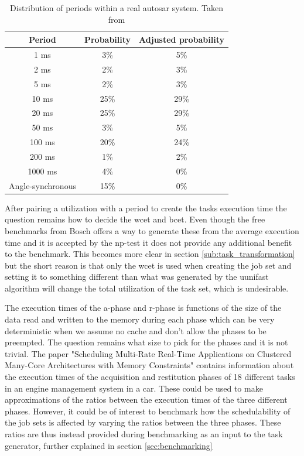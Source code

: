 \documentclass{kththesis}
\begin{document}
\begin{table}
    \centering
    \begin{tabular}{| c | c | c |} 
        \hline
        Period & Probability & Adjusted probability  \\
        \hline
        1 ms & 3\% & 5\% \\
        \hline
        2 ms & 2\% & 3\% \\
        \hline
        5 ms & 2\% & 3\% \\
        \hline
        10 ms & 25\% & 29\% \\
        \hline
        20 ms & 25\% & 29\% \\
        \hline
        50 ms & 3\% & 5\% \\
        \hline
        100 ms & 20\% & 24\% \\
        \hline
        200 ms & 1\% & 2\% \\
        \hline
        1000 ms & 4\% & 0\% \\
        \hline
        Angle-synchronous & 15\% & 0\% \\
        \hline
    \end{tabular}
    \caption{Distribution of periods within a real \acrshort{autosar} system. Taken from \parencite{kramer_real_2015}}
    \label{tab:period_distribution}
\end{table}

After pairing a utilization with a period to create the tasks execution time the question remains
how to decide the \acrshort{wcet} and \acrshort{bcet}. Even though the free benchmarks from Bosch
offers a way to generate these from the average execution time and it is accepted by the
\acrshort{np}-test it does not provide any additional benefit to the benchmark. This becomes more
clear in section \ref{sub:task_transformation} but the short reason is that only the \acrshort{wcet}
is used when creating the job set and setting it to something different than what was generated by
the uunifast algorithm will change the total utilization of the task set, which is undesirable.

The execution times of the \acrshort{a}-phase and \acrshort{r}-phase is functions of the size of
the data read and written to the memory during each phase which can be very deterministic when we
assume no cache and don't allow the phases to be preempted. The question remains what size to pick
for the phases and it is not trivial. The paper "Scheduling Multi-Rate Real-Time Applications on
Clustered Many-Core Architectures with Memory Constraints"\parencite{becker_scheduling_2018} contains
information about the execution times of the acquisition and restitution phases of 18 different
tasks in an engine management system in a car. These could be used to make approximations of the
ratios between the execution times of the three different phases. However, it could be of interest
to benchmark how the schedulability of the job sets is affected by varying the ratios between the
three phases. These ratios are thus instead provided during benchmarking as an input to the task
generator, further explained in section \ref{sec:benchmarking}
\end{document}
